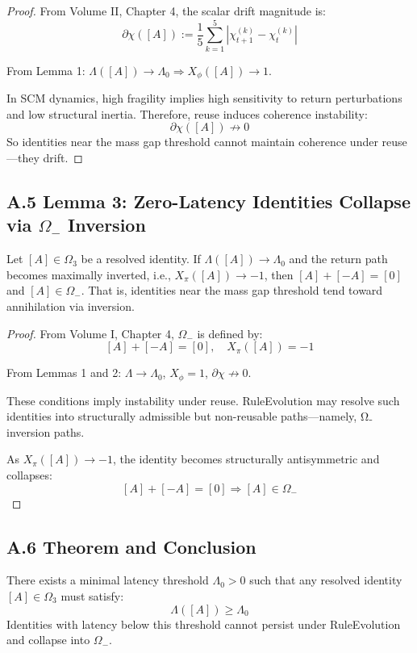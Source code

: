 \begin{proof}
From Volume II, Chapter 4, the scalar drift magnitude is:
\[
\partial \chi([A]) := \frac{1}{5} \sum_{k=1}^5 \left| \chi^{(k)}_{t+1} - \chi^{(k)}_t \right|
\]

From Lemma 1: $\Lambda([A]) \to \Lambda_0 \Rightarrow X_\phi([A]) \to 1$.

In SCM dynamics, high fragility implies high sensitivity to return perturbations and low structural inertia. Therefore, reuse induces coherence instability:
\[
\partial \chi([A]) \not\to 0
\]
So identities near the mass gap threshold cannot maintain coherence under reuse—they drift.
\end{proof}

\subsection*{A.5 Lemma 3: Zero-Latency Identities Collapse via $\Omega_-$ Inversion}

\begin{lemma}
Let $[A] \in \Omega_3$ be a resolved identity. If $\Lambda([A]) \to \Lambda_0$ and the return path becomes maximally inverted, i.e., $X_\pi([A]) \to -1$, then $[A] + [-A] = [0]$ and $[A] \in \Omega_-$. That is, identities near the mass gap threshold tend toward annihilation via inversion.
\end{lemma}

\begin{proof}
From Volume I, Chapter 4, $\Omega_-$ is defined by:
\[
[A] + [-A] = [0],\quad X_\pi([A]) = -1
\]

From Lemmas 1 and 2: $\Lambda \to \Lambda_0$, $X_\phi = 1$, $\partial \chi \not\to 0$.

These conditions imply instability under reuse. RuleEvolution may resolve such identities into structurally admissible but non-reusable paths—namely, Ω₋ inversion paths.

As $X_\pi([A]) \to -1$, the identity becomes structurally antisymmetric and collapses:
\[
[A] + [-A] = [0] \Rightarrow [A] \in \Omega_-
\]
\end{proof}

\subsection*{A.6 Theorem and Conclusion}

\begin{theorem}
There exists a minimal latency threshold $\Lambda_0 > 0$ such that any resolved identity $[A] \in \Omega_3$ must satisfy:
\[
\Lambda([A]) \geq \Lambda_0
\]
Identities with latency below this threshold cannot persist under RuleEvolution and collapse into $\Omega_-$.
\end{theorem}

